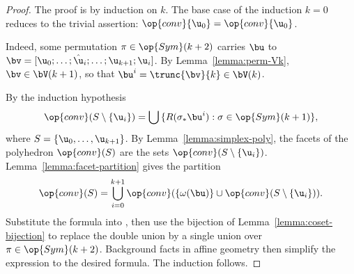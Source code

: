 \begin{proof} The proof is by induction on $k$.  The base case of the induction $k=0$
reduces to the trivial assertion: $\op{conv}\{\u_0\} = \op{conv}\{\u_0\}$.  



  Indeed,  some permutation
$\pi\in \op{Sym}(k+2)$ carries $\bu$ to
$\bv=[\u_0;\ldots;\hat\u_i;\ldots;\u_{k+1};\u_i]$.  By
Lemma~\ref{lemma:perm-Vk}, $\bv\in \bV(k+1)$, so that $\bu^i =
\trunc{\bv}{k}\in \bV(k)$.

By the induction hypothesis 
\begin{equation}\label{eqn:sigma} 
\op{conv}(S\setminus\{\u_i\}) = \bigcup \,\{ R(\sigma_*\bu^i) : \sigma\in \op{Sym}(k+1)\},
\end{equation}
where $S = \{\u_0,\ldots,\u_{k+1}\}$.
By Lemma~\ref{lemma:simplex-poly}, the facets of the polyhedron
$\op{conv}(S)$ are the sets $\op{conv}(S\setminus\{\u_i\})$.
Lemma~\ref{lemma:facet-partition} gives the partition
\begin{equation} \label{eqn:convS}
\op{conv}(S) = \bigcup_{i=0}^{k+1} \op{conv}(\{\omega(\bu)\}\cup \op{conv}(S\setminus\{\u_i\})).
\end{equation}
Substitute the formula  into , then use the bijection of
Lemma~\ref{lemma:coset-bijection} to replace the double union by a single union
over $\pi\in \op{Sym}(k+2)$.  Background facts in affine
geometry then simplify the expression to the desired formula.  The
induction follows.
%
%
%
\end{proof}



